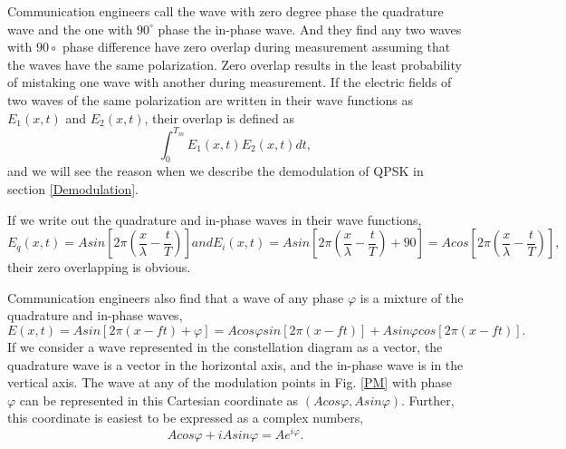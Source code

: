\documentclass[Letter,11pt]{book}
\begin{document}
Communication engineers call the wave with zero degree phase the quadrature wave and the one with $90^\circ$ phase the in-phase wave. And they find any two waves with $90\circ$ phase difference have zero overlap during measurement assuming that the waves have the same polarization. Zero overlap results in the least probability of mistaking one wave with another during measurement. If the electric fields of two waves of the same polarization are written in their wave functions as $E_1 (x,t)$ and $E_2 (x,t)$, their overlap is defined as
\begin{equation}
    \int_{0}^{T_m} E_1 (x,t) E_2 (x,t) dt,
\end{equation}
and we will see the reason when we describe the demodulation of QPSK in section \ref{Demodulation}.

If we write out the quadrature and in-phase waves in their wave functions,
\begin{equation}
    E_q (x,t) = A sin[2\pi(\frac x \lambda - \frac t T)] and
    E_i (x,t) = A sin[2\pi(\frac x \lambda - \frac t T)+90] = A cos[2\pi(\frac x \lambda - \frac t T)],
\end{equation}
their zero overlapping is obvious.

Communication engineers also find that a wave of any phase $\varphi$ is a mixture of the quadrature and in-phase waves,
\begin{equation}
    E (x,t) = A sin[2\pi(x-f t)+\varphi] = A cos\varphi sin [2\pi (x-ft)] + A sin\varphi cos [2\pi (x-ft)].
\end{equation}
If we consider a wave represented in the constellation diagram as a vector, the quadrature wave is a vector in the horizontal axis, and the in-phase wave is in the vertical axis. The wave at any of the modulation points in Fig. \ref{PM} with phase $\varphi$ can be represented in this Cartesian coordinate as $(A cos\varphi, A sin\varphi)$. Further, this  coordinate is easiest to be expressed as a complex numbers,
\begin{equation}
    A cos\varphi + i A sin\varphi  = A e^{i\varphi}.
\end{equation}
\end{document}

